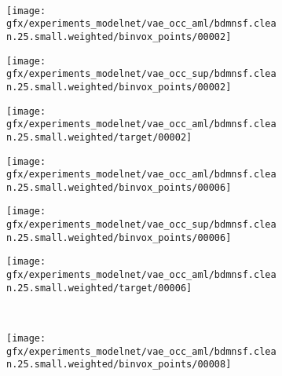 \begin{figure}[t!]
\begin{subfigure}[t]{0.075\textwidth}
    \end{subfigure}\\
    \begin{subfigure}[t]{0.075\textwidth}
        \vspace{0px}
        \centering
        \texttt{[image: gfx/experiments\_modelnet/vae\_occ\_aml/bdmnsf.clean.25.small.weighted/binvox\_points/00002]}
    \end{subfigure}
    \begin{subfigure}[t]{0.075\textwidth}
        \vspace{0px}
        \centering
        \texttt{[image: gfx/experiments\_modelnet/vae\_occ\_sup/bdmnsf.clean.25.small.weighted/binvox\_points/00002]}
    \end{subfigure}
    \begin{subfigure}[t]{0.075\textwidth}
        \vspace{0px}
        \centering
        \texttt{[image: gfx/experiments\_modelnet/vae\_occ\_aml/bdmnsf.clean.25.small.weighted/target/00002]}
    \end{subfigure}
    \begin{subfigure}[t]{0.075\textwidth}
        \vspace{0px}
        \centering
        \texttt{[image: gfx/experiments\_modelnet/vae\_occ\_aml/bdmnsf.clean.25.small.weighted/binvox\_points/00006]}
    \end{subfigure}
    \begin{subfigure}[t]{0.075\textwidth}
        \vspace{0px}
        \centering
        \texttt{[image: gfx/experiments\_modelnet/vae\_occ\_sup/bdmnsf.clean.25.small.weighted/binvox\_points/00006]}
    \end{subfigure}
    \begin{subfigure}[t]{0.075\textwidth}
        \vspace{0px}
        \centering
        \texttt{[image: gfx/experiments\_modelnet/vae\_occ\_aml/bdmnsf.clean.25.small.weighted/target/00006]}
    \end{subfigure}\\
    \begin{subfigure}[t]{0.075\textwidth}
        \vspace{0px}
        \centering
        \texttt{[image: gfx/experiments\_modelnet/vae\_occ\_aml/bdmnsf.clean.25.small.weighted/binvox\_points/00008]}

\end{subfigure}
\end{figure}
